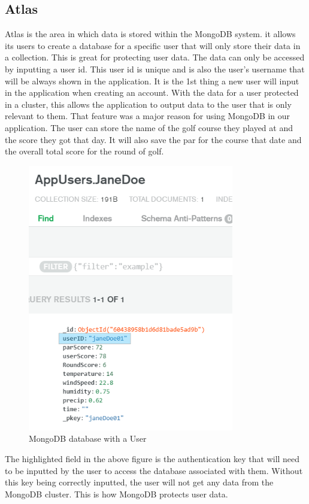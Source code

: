 \subsection{Atlas}
Atlas is the area in which data is stored within the MongoDB system. it allows its users to create a database for a specific user that will only store their data in a collection. \newline This is great for protecting user data. The data can only be accessed by inputting a user id. This user id is unique and is also the user's username that will be always shown in the application. It is the 1st thing a new user will input in the application when creating an account. With the data for a user protected in a cluster, this allows the application to output data to the user that is only relevant to them. That feature was a major reason for using MongoDB in our application.
\newline
The user can store the name of the golf course they played at and the score they got that day. It will also save the par for the course that date and the overall total score for the round of golf. \newline
\begin{figure}[H]
    \centering
    \includegraphics[width=9cm]{img/UserDatabase.png}
    \caption{MongoDB database with a User}
    \label{fig:altas config}
\end{figure}
The highlighted field in the above figure is the authentication key that will need to be inputted by the user to access the database associated with them. Without this key being correctly inputted, the user will not get any data from the MongoDB cluster. This is how MongoDB protects user data.

